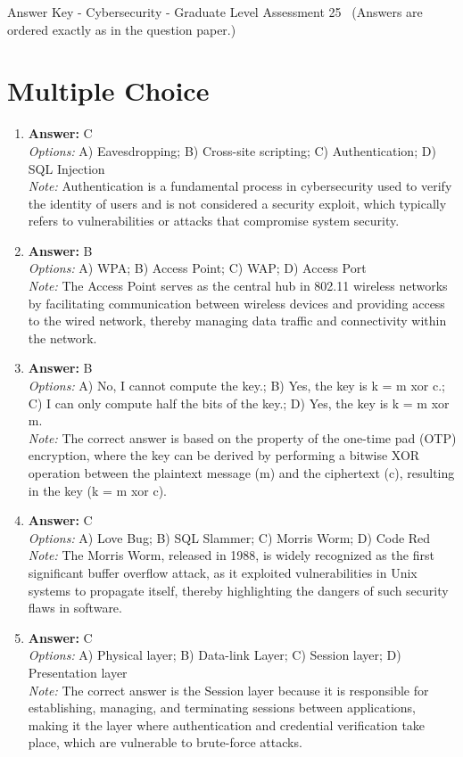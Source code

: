 \documentclass[12pt]{article}
\begin{document}
\begin{center}
Answer Key - Cybersecurity - Graduate Level Assessment 25 \
\small (Answers are ordered exactly as in the question paper.)
\end{center}

\section*{Multiple Choice}
\begin{enumerate}[label=\arabic*.]
\item \textbf{Answer:} C
\\ \textit{Options:} A) Eavesdropping; B) Cross-site scripting; C) Authentication; D) SQL Injection
\\ \textit{Note:} Authentication is a fundamental process in cybersecurity used to verify the identity of users and is not considered a security exploit, which typically refers to vulnerabilities or attacks that compromise system security.
\item \textbf{Answer:} B
\\ \textit{Options:} A) WPA; B) Access Point; C) WAP; D) Access Port
\\ \textit{Note:} The Access Point serves as the central hub in 802.11 wireless networks by facilitating communication between wireless devices and providing access to the wired network, thereby managing data traffic and connectivity within the network.
\item \textbf{Answer:} B
\\ \textit{Options:} A) No, I cannot compute the key.; B) Yes, the key is k = m xor c.; C) I can only compute half the bits of the key.; D) Yes, the key is k = m xor m.
\\ \textit{Note:} The correct answer is based on the property of the one-time pad (OTP) encryption, where the key can be derived by performing a bitwise XOR operation between the plaintext message (m) and the ciphertext (c), resulting in the key (k = m xor c).
\item \textbf{Answer:} C
\\ \textit{Options:} A) Love Bug; B) SQL Slammer; C) Morris Worm; D) Code Red
\\ \textit{Note:} The Morris Worm, released in 1988, is widely recognized as the first significant buffer overflow attack, as it exploited vulnerabilities in Unix systems to propagate itself, thereby highlighting the dangers of such security flaws in software.
\item \textbf{Answer:} C
\\ \textit{Options:} A) Physical layer; B) Data-link Layer; C) Session layer; D) Presentation layer
\\ \textit{Note:} The correct answer is the Session layer because it is responsible for establishing, managing, and terminating sessions between applications, making it the layer where authentication and credential verification take place, which are vulnerable to brute-force attacks.
\end{enumerate}
\end{document}
